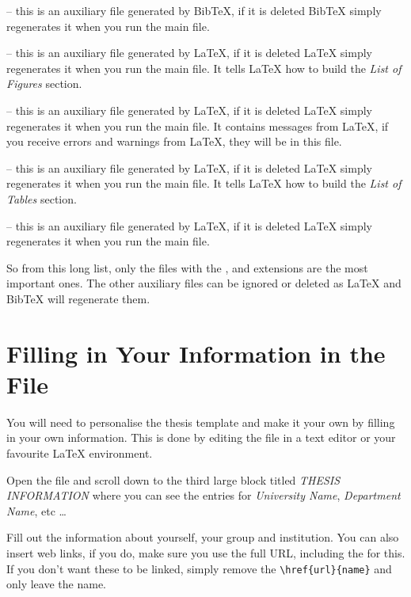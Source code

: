  -- this is an auxiliary file generated by BibTeX, if it is
deleted BibTeX simply regenerates it when you run the main  file.

 -- this is an auxiliary file generated by \LaTeX{}, if it is
deleted \LaTeX{} simply regenerates it when you run the main  file.
It tells \LaTeX{} how to build the \emph{List of Figures} section.

 -- this is an auxiliary file generated by \LaTeX{}, if it is
deleted \LaTeX{} simply regenerates it when you run the main  file.
It contains messages from \LaTeX{}, if you receive errors and warnings from
\LaTeX{}, they will be in this  file.

 -- this is an auxiliary file generated by \LaTeX{}, if it is
deleted \LaTeX{} simply regenerates it when you run the main  file.
It tells \LaTeX{} how to build the \emph{List of Tables} section.

 -- this is an auxiliary file generated by \LaTeX{}, if it is
deleted \LaTeX{} simply regenerates it when you run the main  file.

So from this long list, only the files with the ,  and
 extensions are the most important ones. The other auxiliary files
can be ignored or deleted as \LaTeX{} and BibTeX will regenerate them.


\section{Filling in Your Information in the  File}\label{FillingFile}

You will need to personalise the thesis template and make it your own by filling in your own information. This is done by editing the  file in a text editor or your favourite LaTeX environment.

Open the file and scroll down to the third large block titled \emph{THESIS INFORMATION} where you can see the entries for \emph{University Name}, \emph{Department Name}, etc \ldots

Fill out the information about yourself, your group and institution. You can also insert web links, if you do, make sure you use the full URL, including the  for this. If you don't want these to be linked, simply remove the \verb|\href{url}{name}| and only leave the name.

